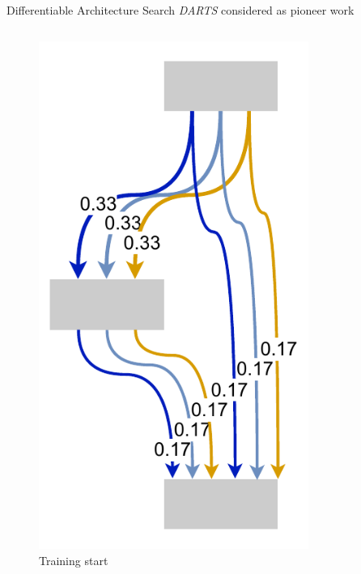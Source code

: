 \documentclass[]{beamer}
\begin{document}
\begin{frame}{Differentiable Architecture Search}
\vspace{10pt}
\textit{DARTS} \cite{Liu2018} considered as pioneer work
\vfill
\begin{columns}
\begin{column}{.35\textwidth}
\begin{figure}
	\includegraphics[scale=0.4, center]{graphics/quick/darts_1.drawio.pdf}
	\caption{Training start}
\end{figure}
\end{column}
\begin{column}{.3\textwidth}
\begin{figure}

\end{figure}
\end{column}
\end{columns}
\end{frame}
\end{document}
